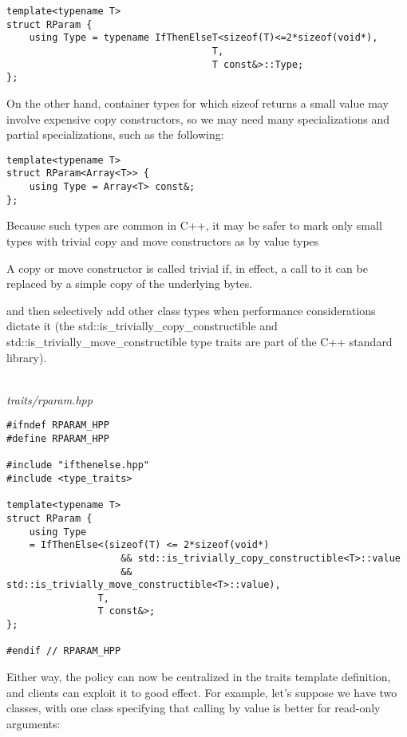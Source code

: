 \begin{lstlisting}[style=styleCXX]
template<typename T>
struct RParam {
	using Type = typename IfThenElseT<sizeof(T)<=2*sizeof(void*),
									T,
									T const&>::Type;
};
\end{lstlisting}

On the other hand, container types for which sizeof returns a small value may involve expensive copy constructors, so we may need many specializations and partial specializations, such as the following:

\begin{lstlisting}[style=styleCXX]
template<typename T>
struct RParam<Array<T>> {
	using Type = Array<T> const&;
};
\end{lstlisting}

Because such types are common in C++, it may be safer to mark only small types with trivial copy and move constructors as by value types

\begin{tcolorbox}[colback=webgreen!5!white,colframe=webgreen!75!black]
\hspace*{0.75cm}A copy or move constructor is called trivial if, in effect, a call to it can be replaced by a simple copy of the underlying bytes.
\end{tcolorbox}

and then selectively add other class types when performance considerations dictate it (the std::is\_trivially\_copy\_constructible and std::is\_trivially\_move\_constructible type traits are part of the C++ standard library).

\hspace*{\fill} \\ %
\noindent
\textit{traits/rparam.hpp}
\begin{lstlisting}[style=styleCXX]
#ifndef RPARAM_HPP
#define RPARAM_HPP

#include "ifthenelse.hpp"
#include <type_traits>

template<typename T>
struct RParam {
	using Type
	= IfThenElse<(sizeof(T) <= 2*sizeof(void*)
					&& std::is_trivially_copy_constructible<T>::value
					&& std::is_trivially_move_constructible<T>::value),
				T,
				T const&>;
};

#endif // RPARAM_HPP
\end{lstlisting}

Either way, the policy can now be centralized in the traits template definition, and clients can exploit it to good effect. For example, let’s suppose we have two classes, with one class specifying that calling by value is better for read-only arguments:

